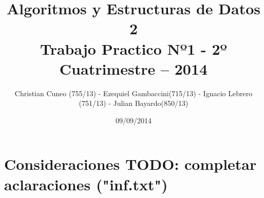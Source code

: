 ﻿\documentclass[a4paper, 10pt]{article}
\title{Algoritmos y Estructuras de Datos 2 \\ Trabajo Practico Nº1 - 2º Cuatrimestre – 2014}
\author{Christian Cuneo (755/13) - Ezequiel Gambaccini(715/13) - Ignacio Lebrero (751/13) - Julian Bayardo(850/13)}
\date{09/09/2014}
\begin{document}
    \maketitle
    \section*{Consideraciones TODO: completar aclaraciones ("inf.txt")}
        
    \clearpage
        
    \clearpage
\end{document}
